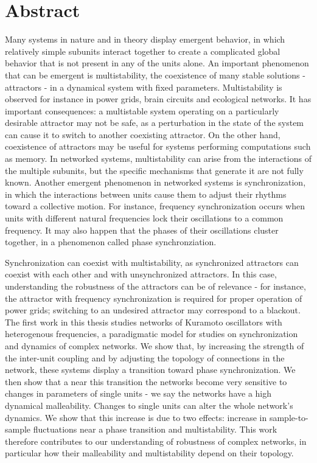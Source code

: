 \section*{Abstract}

Many systems in nature and in theory display emergent behavior, in which relatively simple subunits interact together to create a complicated global behavior that is not present in any of the units alone. An important phenomenon that can be emergent is multistability, the coexistence of many stable solutions - attractors - in a dynamical system with fixed parameters. Multistability is observed for instance in power grids, brain circuits and ecological networks. It has important consequences: a multistable system operating on a particularly desirable attractor may not be safe, as a perturbation in the state of the system can cause it to switch to another coexisting attractor. On the other hand, coexistence of attractors may be useful for systems performing computations such as memory. In networked systems, multistability can arise from the interactions of the multiple subunits, but the specific mechanisms that generate it are not fully known. Another emergent phenomenon in networked systems is synchronization, in which the interactions between units cause them to adjust their rhythms toward a collective motion. For instance, frequency synchronization occurs when units with different natural frequencies lock their oscillations to a common frequency. It may also happen that the phases of their oscillations cluster together, in a phenomenon called phase synchronziation. 

Synchronization can coexist with multistability, as synchronized attractors can coexist with each other and with unsynchronized attractors. In this case, understanding the robustness of the attractors can be of relevance - for instance, the attractor with frequency synchronization is required for proper operation of power grids; switching to an undesired attractor may correspond to a blackout. The first work in this thesis studies networks of Kuramoto oscillators with heterogenous frequencies, a paradigmatic model for studies on synchronization and dynamics of complex networks. We show that, by increasing the strength of the inter-unit coupling and by adjusting the topology of connections in the network, these systems display a transition toward phase synchronization. We then show that a near this transition the networks become very sensitive to changes in parameters of single units - we say the networks have a high dynamical malleability. Changes to single units can alter the whole network's dynamics. We show that this increase is due to two effects: increase in sample-to-sample fluctuations near a phase transition and multistability. This work therefore contributes to our understanding of robustness of complex networks, in particular how their malleability and multistability depend on their topology. 


